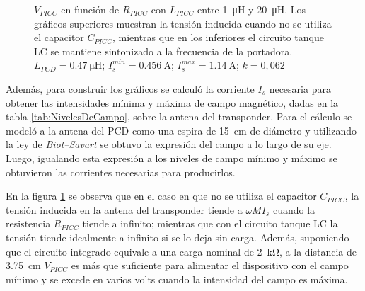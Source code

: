 \begin{figure}
	\shorthandon{<>}
	\caption{\(V_{PICC}\) en función de \(R_{PICC}\) con \(L_{PICC}\) 
	entre \SI{1}{\micro\henry} y \SI{20}{\micro\henry}. Los gráficos 
	superiores muestran la tensión inducida cuando no se utiliza el 
	capacitor \(C_{PICC}\), mientras que en los inferiores el circuito 
	tanque LC se mantiene sintonizado a la frecuencia de la portadora. 
	\(L_{PCD}=\SI{0.47}{\micro\henry}\); 
	\(I_{s}^{min}=\SI{0.456}{\ampere}\); 
	\(I_{s}^{max}=\SI{1.14}{\ampere}\); 
	\(k=0,062\)}
	\label{fig:TensionInducida}
\end{figure}

Además, para construir los gráficos se calculó  
la corriente \(I_s\) necesaria para obtener las intensidades mínima y máxima 
de campo magnético, dadas en la tabla \ref{tab:NivelesDeCampo}, sobre la 
antena del transponder. Para el cálculo se modeló a la antena del PCD 
como una espira de \SI{15}{\centi\meter} de diámetro y utilizando la 
ley de \emph{Biot--Savart} se obtuvo la expresión del campo a lo largo 
de su eje. Luego, igualando esta expresión a los niveles de campo 
mínimo y máximo se obtuvieron las corrientes necesarias para producirlos.

En la figura \ref{fig:TensionInducida} se observa que en el caso en que no 
se utiliza el capacitor \(C_{PICC}\), la tensión inducida en la antena del 
transponder tiende a \(\omega M I_s\) cuando la resistencia \(R_{PICC}\) 
tiende a infinito; mientras que con el circuito tanque LC la tensión tiende 
idealmente a infinito si se lo deja sin carga. Además, suponiendo que el 
circuito integrado equivale a una carga nominal de \SI{2}{\kilo\ohm}, a la 
distancia de \SI{3.75}{cm} \(V_{PICC}\) es más que suficiente para alimentar 
el dispositivo con el campo mínimo y se excede en varios volts cuando la 
intensidad del campo es máxima.


